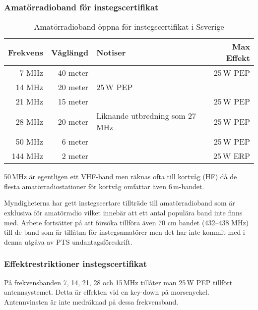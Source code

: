 \subsubsection{Amatörradioband för instegscertifikat}

\begin{table}[H]
\centering
\begin{tabular}{rrlr}
  \textbf{Frekvens} & \textbf{Våglängd} & \textbf{Notiser}               & \textbf{Max Effekt} \\ \hline
              7 MHz &          40 meter &                                &           25\,W PEP \\
             14 MHz &          20 meter & 25\,W PEP                      &                     \\
             21 MHz &          15 meter &                                &           25\,W PEP \\
             28 MHz &          20 meter & Liknande utbredning som 27 MHz &           25\,W PEP \\
             50 MHz &           6 meter &                                &           25\,W PEP \\ \hline
            144 MHz &           2 meter &                                &           25\,W ERP


\end{tabular}
\caption{Amatörradioband öppna för instegscertifikat i Ssverige}
\end{table}

50\,MHz är egentligen ett VHF-band men räknas ofta till kortvåg (HF) då de
flesta amatörradiostationer för kortvåg omfattar även 6\,m-bandet.

Myndigheterna har gett instegscertare tillträde till amatörradioband som är
exklusiva för amatörradio vilket innebär att ett antal populära band inte finns
med. Arbete fortsätter på att försöka tillföra även 70 cm bandet (432--438 MHz)
till de band som är tillåtna för instegsamatörer men det har inte kommit med i
denna utgåva av PTS undantagsföreskrift.

\subsubsection{Effektrestriktioner instegscertifikat}

På frekvensbanden 7, 14, 21, 28 och 15\,MHz tillåter man 25\,W PEP tillfört
antennsystemet. Detta är effekten vid en key-down på morsenyckel. Antennvinsten
är inte medräknad på dessa frekvensband.

